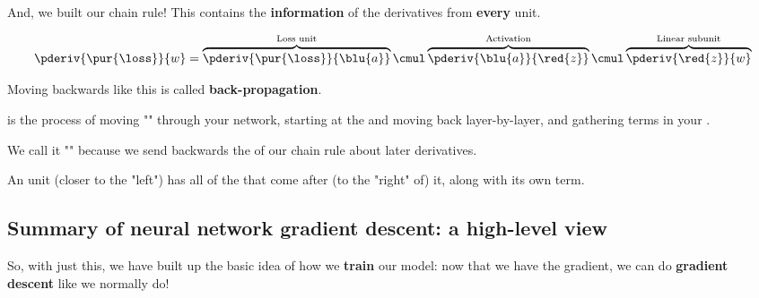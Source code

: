         And, we built our chain rule! This contains the \textbf{information} of the derivatives from \textbf{every} unit.
        
        \begin{equation}
            \pderiv {\pur{\loss}} {w} 
            =
            \overbrace{
                \pderiv {\pur{\loss}} {\blu{a}} 
            }^{\text{Loss unit}}
            \cmul
            \overbrace{
                \pderiv {\blu{a}}     {\red{z}}
            }^{\text{Activation}}
                \cmul
            \overbrace{
                \pderiv {\red{z}}     {w}
            }^{\text{Linear subunit}}
        \end{equation}
        
        Moving backwards like this is called \textbf{back-propagation}.\\
        
        \begin{definition}
             is the process of moving "" through your network, starting at the  and moving back layer-by-layer, and gathering terms in your .
            
            We call it "" because we send backwards the  of our chain rule about later derivatives.
            
            An  unit (closer to the "left") has all of the  that come after (to the "right" of) it, along with its own term.
        \end{definition}
        
    \secdiv
    
    \subsection*{Summary of neural network gradient descent: a high-level view}
    
        So, with just this, we have built up the basic idea of how we \textbf{train} our model: now that we have the gradient, we can do \textbf{gradient descent} like we normally do!
            \\
        
